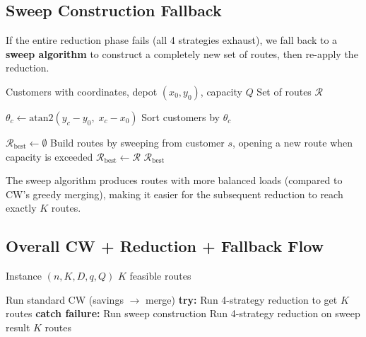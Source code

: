 \documentclass[12pt,a4paper]{article}
\theoremstyle{definition}
\begin{document}
\subsection{Sweep Construction Fallback}

If the entire reduction phase fails (all 4 strategies exhaust), we fall back to a \textbf{sweep algorithm} to construct a completely new set of routes, then re-apply the reduction.

\begin{algorithm}[H]
\caption{Sweep Construction}
\begin{algorithmic}[1]
\Require Customers with coordinates, depot $(x_0, y_0)$, capacity $Q$
\Ensure Set of routes $\mathcal{R}$

    \State $\theta_c \gets \text{atan2}(y_c - y_0, \; x_c - x_0)$
\EndFor
\State Sort customers by $\theta_c$

\State $\mathcal{R}_{\text{best}} \gets \emptyset$
 
    \State Build routes by sweeping from customer $s$, opening a new route when capacity is exceeded
        \State $\mathcal{R}_{\text{best}} \gets \mathcal{R}$
    \EndIf
\EndFor
\State \Return $\mathcal{R}_{\text{best}}$
\end{algorithmic}
\end{algorithm}

The sweep algorithm produces routes with more balanced loads (compared to CW's greedy merging), making it easier for the subsequent reduction to reach exactly $K$ routes.

\subsection{Overall CW + Reduction + Fallback Flow}

\begin{algorithm}[H]
\caption{Enhanced Clarke-Wright --- Complete Procedure}
\begin{algorithmic}[1]
\Require Instance $(n, K, D, q, Q)$
\Ensure $K$ feasible routes

\State Run standard CW (savings $\to$ merge)
\State \textbf{try:}
\State \quad Run 4-strategy reduction to get $K$ routes
\State \textbf{catch failure:}
\State \quad Run sweep construction
\State \quad Run 4-strategy reduction on sweep result
\State \Return $K$ routes
\end{algorithmic}
\end{algorithm}
\end{document}
